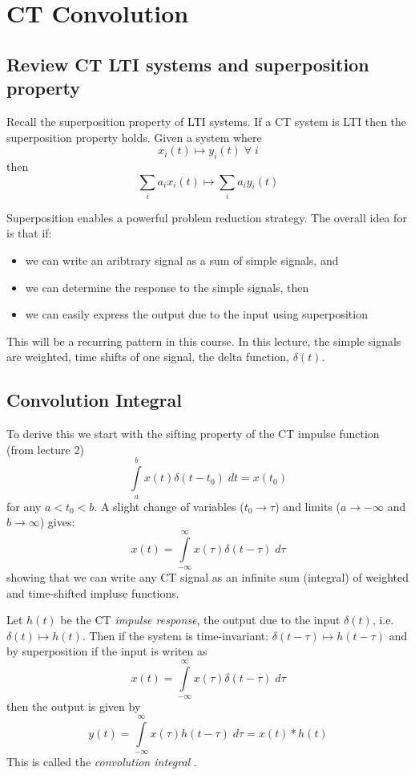 \chapter{CT Convolution}

\section{Review CT LTI systems and superposition property}

Recall the superposition property of LTI systems. If a CT system is LTI then the superposition property holds. Given a system where
\[   
x_i(t) \mapsto y_i(t) \; \forall\; i
\]
then
\[
\sum\limits_{i} a_i x_i(t) \mapsto \sum\limits_{i} a_i y_i(t) 
\]

Superposition enables a powerful problem reduction strategy. The overall idea for is that if:

\begin{itemize}
\item we can write an aribtrary signal as a sum of simple signals, and 
\item we can determine the response to the simple signals, then
\item we can easily express the output due to the input using superposition
\end{itemize}

This will be a recurring pattern in this course. In this lecture, the simple signals are weighted, time shifts of one signal, the delta function, $\delta(t)$.

\section{Convolution Integral}

To derive this we start with the sifting property of the CT impulse function (from lecture 2)
\[
\int\limits_{a}^{b} x(t)\delta(t-t_0) \; dt = x(t_0)
\]
for any $a < t_0 < b$. A slight change of variables ($t_0 \rightarrow \tau$) and limits ($a \rightarrow -\infty$ and $b \rightarrow \infty$) gives:
\[
x(t) = \int\limits_{-\infty}^{\infty} x(\tau)\delta(t-\tau) \; d\tau
\]
showing that we can write any CT signal as an infinite sum (integral) of weighted and time-shifted impluse functions.

Let $h(t)$ be the CT {\it impulse response}, the output due to the input $\delta(t)$, i.e. $\delta(t) \mapsto h(t)$. Then if the system is time-invariant: $\delta(t-\tau) \mapsto h(t-\tau)$ and by superposition if the input is writen as
\[
x(t) = \int\limits_{-\infty}^{\infty} x(\tau)\delta(t-\tau) \; d\tau
\]
then the output is given by
\[
  y(t) = \int\limits_{-\infty}^{\infty} x(\tau)h(t-\tau) \; d\tau = x(t) * h(t)
\]
This is called the \emph{convolution integral} .

